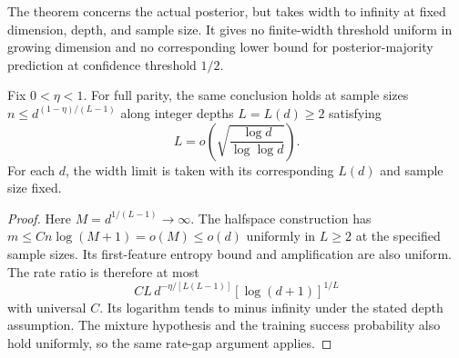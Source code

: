 The theorem concerns the actual posterior, but takes width to infinity
at fixed dimension, depth, and sample size. It gives no finite-width
threshold uniform in growing dimension and no corresponding lower
bound for posterior-majority prediction at confidence threshold $1/2$.

\begin{corollary}
\label{cor:critical-growing-depth-sample-lower}
Fix $0<\eta<1$. For full parity, the same conclusion holds at sample sizes
$n\le d^{(1-\eta)/(L-1)}$ along integer depths $L=L(d)\ge2$ satisfying
\[
 L=o\!\left(\sqrt{\frac{\log d}{\log\log d}}\right).
\]
For each $d$, the width limit is taken with its corresponding $L(d)$
and sample size fixed.
\end{corollary}

\begin{proof}
Here $M=d^{1/(L-1)}\to\infty$. The halfspace construction has
$m\le Cn\log(M+1)=o(M)\le o(d)$ uniformly in $L\ge2$ at the
specified sample sizes. Its first-feature entropy bound and amplification
are also uniform. The rate ratio is therefore at most
\[
 C L\,d^{-\eta/[L(L-1)]}[\log(d+1)]^{1/L}
\]
with universal $C$. Its logarithm tends to minus infinity under the
stated depth assumption. The mixture hypothesis and the training
success probability also hold uniformly, so the same rate-gap argument
applies.
\end{proof}
